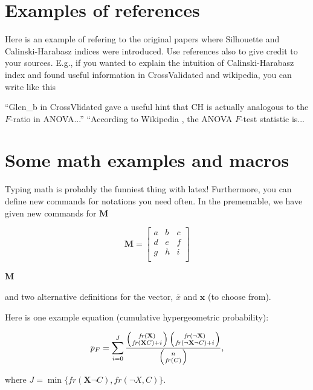 \documentclass[a4paper,12pt]{article}
\newcommand{\Mmatr}{\ensuremath{\mathbf{M}}}
\newcommand{\xvec}{\ensuremath{\overline{x}}}
\newcommand{\xvecII}{\ensuremath{\mathbf{x}}} %
\newcommand{\Xset}{\ensuremath{\mathbf{X}}}
\newcommand{\fr}{\ensuremath{\mathit{fr}}} %
\begin{document}
\section{Examples of references}

Here is an example of refering to
the original papers where Silhouette \cite{SI} and Calinski-Harabasz \cite{CH} indices were introduced.
Use references also to give credit to your sources. E.g., if you
wanted to explain the intuition of Calinski-Harabasz index
and found useful information in CrossValidated and wikipedia, you can
write like this

``Glen\_b in CrossVlidated \cite{glennCV} gave a useful hint that CH
is actually analogous to the $F$-ratio in ANOVA...'' ``According to Wikipedia \cite{Fwiki}, the ANOVA $F$-test statistic is...


\section{Some math examples and macros}

Typing math is probably the funniest thing with latex! Furthermore,
you can define new commands for notations you need often. In the
prememable, we have given new commands for $\Mmatr$

$$\Mmatr=\left[
    \begin{array}{ccc}
      a & b & c \\
      d & e & f \\
      g & h & i \\
    \end{array}\right]$$


$\Mmatr$

and two alternative definitions for the vector, $\xvec$ and $\xvecII$ (to choose from).

Here is one example equation (cumulative hypergeometric probability):

$$p_F=\sum_{i=0}^J\frac{\left(\fr(\Xset) \atop \fr(\Xset C)+i
    \right) \left(\fr(\neg \Xset) \atop \fr(\neg \Xset \neg C)+i \right)}{\left(
    n
    \atop \fr(C)\right)},$$

where $J=\min\{\fr(\Xset\neg C),\fr(\neg X,C)\}$.

% 

% 
\end{document}
